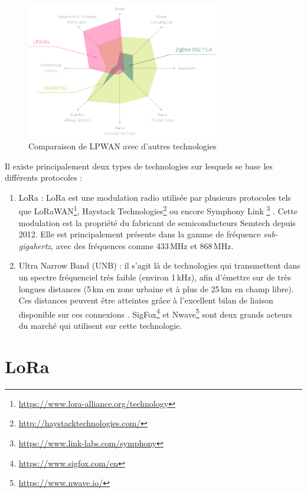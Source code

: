 \begin{figure}[ht!]
    \centering
    \includegraphics[width=0.75\textwidth]{Figures/StateOfTheArt/lpwan_vs_others.png}
    \caption{Comparaison de LPWAN avec d'autres technologies}
    \label{fig-lpwan_vs_others}
\end{figure}

Il existe principalement deux types de technologies sur lesquels se base les différents protocoles :
\begin{enumerate}
    \item LoRa : LoRa est une modulation radio utilisée par plusieurs protocoles tels que LoRaWAN\footnote{\url{https://www.lora-alliance.org/technology}}, Haystack Technologies\footnote{\url{http://haystacktechnologies.com/}} ou encore Symphony Link \footnote{\url{https://www.link-labs.com/symphony}} \cite{LPWANWik63:online}. Cette modulation est la propriété du fabricant de semiconducteurs Semtech depuis 2012. Elle est principalement présente dans la gamme de fréquence \textit{sub-gigahertz}, avec des fréquences comme 433\,MHz et 868\,MHz.
    
    \item Ultra Narrow Band (UNB) : il s'agit là de technologies qui transmettent dans un spectre fréquenciel très faible (environ 1\,kHz), afin d'émettre sur de très longues distances (5\,km en zone urbaine et à plus de 25\,km en champ libre). Ces distances peuvent être atteintes grâce à l'excellent bilan de liaison disponible sur ces connexions \cite{WANUltra71:online}. SigFox\footnote{\url{https://www.sigfox.com/en}} et Nwave\footnote{\url{https://www.nwave.io/}} sont deux grands acteurs du marché qui utilisent sur cette technologie.
\end{enumerate}



\section{LoRa}
\label{sec_stateOfTheArtLoRa}


